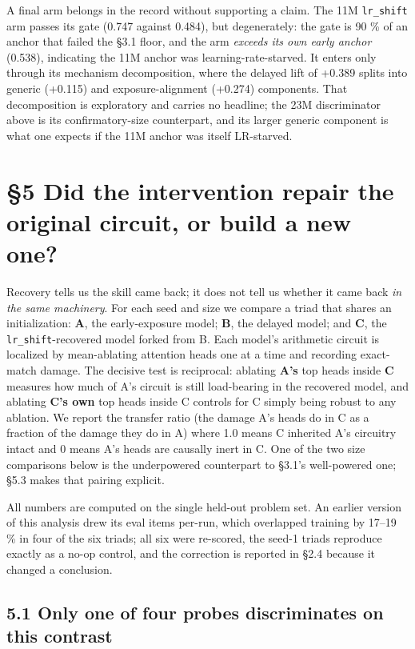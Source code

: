 \documentclass[11pt]{article}
\begin{document}
A final arm belongs in the record without supporting a claim. The 11M \texttt{lr\_shift} arm passes
its gate (0.747 against 0.484), but degenerately: the gate is 90 \% of an anchor that failed
the §3.1 floor, and the arm \emph{exceeds its own early anchor} (0.538), indicating the 11M
anchor was learning-rate-starved. It enters only through its mechanism decomposition, where
the delayed lift of +0.389 splits into generic (+0.115) and exposure-alignment (+0.274)
components. That decomposition is exploratory and carries no headline; the 23M
discriminator above is its confirmatory-size counterpart, and its larger generic component
is what one expects if the 11M anchor was itself LR-starved.

\section{§5 Did the intervention repair the original circuit, or build a new one?}\label{did-the-intervention-repair-the-original-circuit-or-build-a-new-one}

Recovery tells us the skill came back; it does not tell us whether it came back \emph{in the same
machinery}. For each seed and size we compare a triad that shares an initialization: \textbf{A},
the early-exposure model; \textbf{B}, the delayed model; and \textbf{C}, the \texttt{lr\_shift}-recovered model
forked from B. Each model's arithmetic circuit is localized by mean-ablating attention heads
one at a time and recording exact-match damage. The decisive test is reciprocal: ablating
\textbf{A's} top heads inside \textbf{C} measures how much of A's circuit is still load-bearing in the
recovered model, and ablating \textbf{C's own} top heads inside C controls for C simply being
robust to any ablation. We report the transfer ratio (the damage A's heads do in C as a
fraction of the damage they do in A) where 1.0 means C inherited A's circuitry intact and 0
means A's heads are causally inert in C. One of the two size comparisons below is the
underpowered counterpart to §3.1's well-powered one; §5.3 makes that pairing explicit.

All numbers are computed on the single held-out problem set. An earlier version of this
analysis drew its eval items per-run, which overlapped training by 17--19 \% in four of the six
triads; all six were re-scored, the seed-1 triads reproduce exactly as a no-op control, and
the correction is reported in §2.4 because it changed a conclusion.

\subsection{5.1 Only one of four probes discriminates on this contrast}\label{only-one-of-four-probes-discriminates-on-this-contrast}
\end{document}
